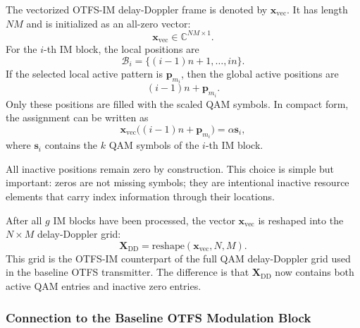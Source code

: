 The vectorized OTFS-IM delay-Doppler frame is denoted by \(\mathbf{x}_{\mathrm{vec}}\). It has length \(NM\) and is initialized as an all-zero vector:
\begin{equation}
    \mathbf{x}_{\mathrm{vec}} \in \mathbb{C}^{NM \times 1}.
\end{equation}
For the \(i\)-th IM block, the local positions are
\begin{equation}
    \mathcal{B}_i
    =
    \{(i-1)n+1,\ldots,in\}.
\end{equation}
If the selected local active pattern is \(\mathbf{p}_{m_i}\), then the global active positions are
\begin{equation}
    (i-1)n + \mathbf{p}_{m_i}.
    \label{eq:tx_global_active_positions}
\end{equation}
Only these positions are filled with the scaled QAM symbols. In compact form, the assignment can be written as
\begin{equation}
    \mathbf{x}_{\mathrm{vec}}\big((i-1)n+\mathbf{p}_{m_i}\big)
    =
    \alpha \mathbf{s}_i,
    \label{eq:tx_xvec_assignment}
\end{equation}
where \(\mathbf{s}_i\) contains the \(k\) QAM symbols of the \(i\)-th IM block.

All inactive positions remain zero by construction. This choice is simple but important: zeros are not missing symbols; they are intentional inactive resource elements that carry index information through their locations.

After all \(g\) IM blocks have been processed, the vector \(\mathbf{x}_{\mathrm{vec}}\) is reshaped into the \(N \times M\) delay-Doppler grid:
\begin{equation}
    \mathbf{X}_{\mathrm{DD}}
    =
    \mathrm{reshape}
    \left(
    \mathbf{x}_{\mathrm{vec}}, N, M
    \right).
    \label{eq:tx_xdd_reshape}
\end{equation}
This grid is the OTFS-IM counterpart of the full QAM delay-Doppler grid used in the baseline OTFS transmitter. The difference is that \(\mathbf{X}_{\mathrm{DD}}\) now contains both active QAM entries and inactive zero entries.

\subsubsection{Connection to the Baseline OTFS Modulation Block}

